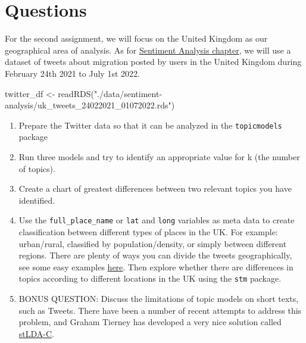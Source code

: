 \documentclass[
  letterpaper,
  DIV=11,
  numbers=noendperiod]{scrreprt}
\newenvironment{Shaded}{\begin{snugshade}}{\end{snugshade}}
\newcommand{\FunctionTok}[1]{\textcolor[rgb]{0.28,0.35,0.67}{#1}}
\newcommand{\NormalTok}[1]{\textcolor[rgb]{0.00,0.23,0.31}{#1}}
\newcommand{\OtherTok}[1]{\textcolor[rgb]{0.00,0.23,0.31}{#1}}
\newcommand{\StringTok}[1]{\textcolor[rgb]{0.13,0.47,0.30}{#1}}
\begin{document}
\hypertarget{questions-4}{%
\section{Questions}\label{questions-4}}

For the second assignment, we will focus on the United Kingdom as our
geographical area of analysis. As for
\href{https://www.population-science.net/sentiment-analysis.html}{Sentiment
Analysis chapter}, we will use a dataset of tweets about migration
posted by users in the United Kingdom during February 24th 2021 to July
1st 2022.

\begin{Shaded}
\begin{Highlighting}[]
\NormalTok{twitter\_df }\OtherTok{\textless{}{-}} \FunctionTok{readRDS}\NormalTok{(}\StringTok{"./data/sentiment{-}analysis/uk\_tweets\_24022021\_01072022.rds"}\NormalTok{)}
\end{Highlighting}
\end{Shaded}

\begin{enumerate}
\def\labelenumi{\arabic{enumi}.}
\item
  Prepare the Twitter data so that it can be analyzed in the
  \texttt{topicmodels} package
\item
  Run three models and try to identify an appropriate value for k (the
  number of topics).
\item
  Create a chart of greatest differences between two relevant topics you
  have identified.
\item
  Use the \texttt{full\_place\_name} or \texttt{lat} and \texttt{long}
  variables as meta data to create classification between different
  types of places in the UK. For example: urban/rural, classified by
  population/density, or simply between different regions. There are
  plenty of ways you can divide the tweets geographically, see some easy
  examples
  \href{https://statistics.ukdataservice.ac.uk/dataset/2011-census-geography-boundaries-local-authorities/resource/928039eb-e75a-4648-814e-32498dcc5db6}{here}.
  Then explore whether there are differences in topics according to
  different locations in the UK using the \texttt{stm} package.
\item
  BONUS QUESTION: Discuss the limitations of topic models on short
  texts, such as Tweets. There have been a number of recent attempts to
  address this problem, and Graham Tierney has developed a very nice
  solution called
  \href{https://github.com/g-tierney/stLDA-C_public}{stLDA-C}.
\end{enumerate}
\end{document}
